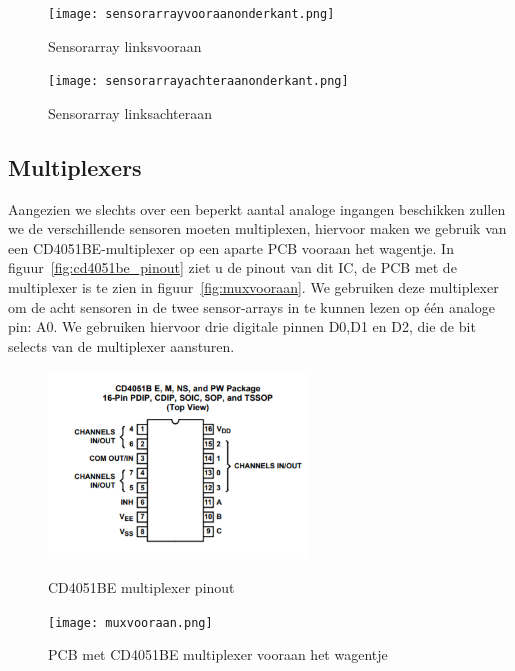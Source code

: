 \begin{figure}[H]
	\centering
	\begin{minipage}[b]{0.4\textwidth}
		\centering
		\texttt{[image: sensorarrayvooraanonderkant.png]}
		\caption{Sensorarray linksvooraan}
		\label{fig:sensorarrayvooraan}
	\end{minipage}
	\hfill
	\begin{minipage}[b]{0.4\textwidth}
		\centering
		\texttt{[image: sensorarrayachteraanonderkant.png]}
		\caption{Sensorarray linksachteraan}
		\label{fig:sensorarrayachteraan}
	\end{minipage}
\end{figure}

\subsection{Multiplexers}
Aangezien we slechts over een beperkt aantal analoge ingangen beschikken zullen we de verschillende sensoren moeten multiplexen, hiervoor maken we gebruik van een CD4051BE-multiplexer op een aparte PCB vooraan het wagentje. In figuur~\vref{fig:cd4051be_pinout} ziet u de pinout van dit IC, de PCB met de multiplexer is te zien in figuur~\vref{fig:muxvooraan}. We gebruiken deze multiplexer om de acht sensoren in de twee sensor-arrays in te kunnen lezen op \'e\'en analoge pin: A0. We gebruiken hiervoor drie digitale pinnen D0,D1 en D2, die de bit selects van de multiplexer aansturen.

\begin{figure}[H]
	\centering
	\begin{minipage}[b]{0.4\textwidth}
		\includegraphics[height=5cm]{cd4051be_pinout.png}
		\caption{CD4051BE multiplexer pinout}
		\label{fig:cd4051be_pinout}
	\end{minipage}
	\hfill
	\begin{minipage}[b]{0.4\textwidth}
		\texttt{[image: muxvooraan.png]}
		\caption{PCB met CD4051BE multiplexer vooraan het wagentje}
		\label{fig:muxvooraan}
	\end{minipage}
\end{figure}
